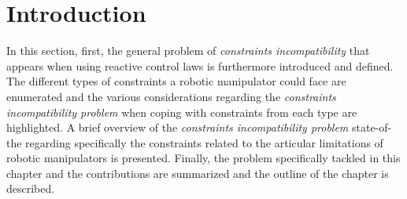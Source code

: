 \begin{synopsis}
\end{synopsis}
\section{Introduction}
\label{sec:intro constrcomp}
In this section, first, the general problem of \textit{constraints incompatibility} that appears when using reactive control laws is furthermore introduced and defined. The different types of constraints a robotic manipulator could face are enumerated and the various considerations regarding the \textit{constraints incompatibility problem} when coping with constraints from each type are highlighted. A brief overview of the \textit{constraints incompatibility problem} state-of-the regarding specifically the constraints related to the articular limitations of robotic manipulators is presented. Finally, the problem specifically tackled in this chapter and the contributions are summarized and the outline of the chapter is described.
